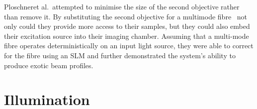 Ploschneret al.~attempted to minimise the size of the second objective rather than remove it.
By substituting the second objective for a multimode fibre~\cite{ploschner_multimode_2015} not only could they provide more access to their samples, but they could also embed their excitation source into their imaging chamber.
Assuming that a multi-mode fibre operates deterministically on an input light source, they were able to correct for the fibre using an SLM and further demonstrated the system's ability to produce exotic beam profiles.








\section{Illumination}


